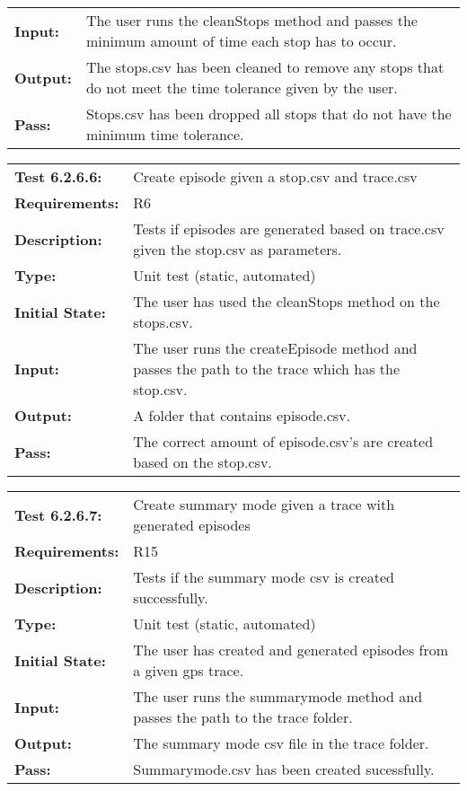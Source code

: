 \documentclass[12pt, titlepage]{article}
\begin{document}
{\begin{tabular}{|l|p{10cm}|}
    \bf{Input}: & The user runs the cleanStops method and passes the minimum amount of time each stop has to occur. \\
    \bf{Output}: & The stops.csv has been cleaned to remove any stops that do not meet the time tolerance given by the user. \\
    \bf{Pass}: & Stops.csv has been dropped all stops that do not have the minimum time tolerance. \\
    \hline
\end{tabular}
\begin{tabular}{|l|p{10cm}|}
    \hline
    \bf{Test} 6.2.6.6: & Create episode given a stop.csv and trace.csv \\
    \bf{Requirements}: &  R6 \\
    \bf{Description}: & Tests if episodes are generated based on trace.csv given the stop.csv as parameters. \\
    \bf{Type}: & Unit test (static, automated) \\
    \bf{Initial State}: & The user has used the cleanStops method on the stops.csv. \\
    \bf{Input}: & The user runs the createEpisode method and passes the path to the trace which has the stop.csv. \\
    \bf{Output}: & A folder that contains episode.csv. \\
    \bf{Pass}: & The correct amount of episode.csv's are created based on the stop.csv. \\
    \hline
\end{tabular}
\begin{tabular}{|l|p{10cm}|}
    \hline
    \bf{Test} 6.2.6.7: & Create summary mode given a trace with generated episodes \\
    \bf{Requirements}: & R15 \\
    \bf{Description}: & Tests if the summary mode csv is created successfully. \\
    \bf{Type}: & Unit test (static, automated) \\
    \bf{Initial State}: & The user has created and generated episodes from a given gps trace. \\
    \bf{Input}: & The user runs the summarymode method and passes the path to the trace folder. \\
    \bf{Output}: & The summary mode csv file in the trace folder. \\
    \bf{Pass}: & Summarymode.csv has been created sucessfully. \\

\end{tabular}}
\end{document}
